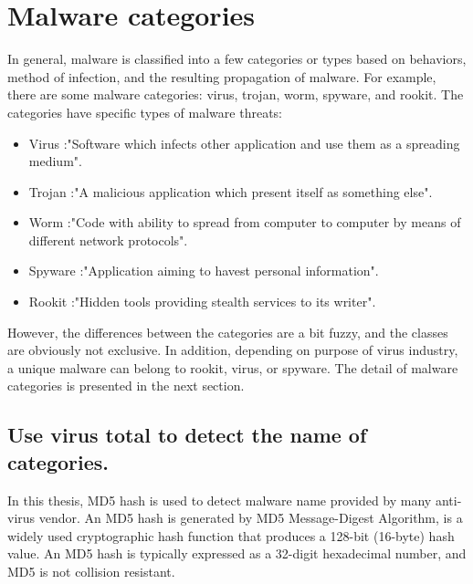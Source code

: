 \section{Malware categories}

In general, malware is classified into a few categories or types based on behaviors, method of infection, and the resulting propagation of malware. For example, there are some malware categories: virus, trojan, worm, spyware, and rookit. The categories have specific types of malware threats:

\begin{itemize}
\item Virus :"Software which infects other application and use them as a spreading medium"\cite{BlackHat}.
\item Trojan :"A malicious application which present itself as something else"\cite{BlackHat}.
\item Worm :"Code with ability to spread from computer to computer by means of different network protocols"\cite{BlackHat}.
\item Spyware :"Application aiming to havest personal information"\cite{BlackHat}.
\item Rookit :"Hidden tools providing stealth services to its writer"\cite{BlackHat}.
\end{itemize}

However, the differences between the categories are a bit fuzzy, and the classes are obviously not exclusive. In addition, depending on purpose of virus industry, a unique malware can belong to rookit, virus, or spyware. The detail of malware categories is presented in the next section. 
\subsection{Use virus total to detect the name of categories.}

In this thesis, MD5 hash is used to detect malware name provided by many anti-virus vendor. An MD5 hash is generated by MD5 Message-Digest Algorithm, is a widely used cryptographic hash function that produces a 128-bit (16-byte) hash value. An MD5 hash is typically expressed as a 32-digit hexadecimal number, and MD5 is not collision resistant\cite{wiki1}.

